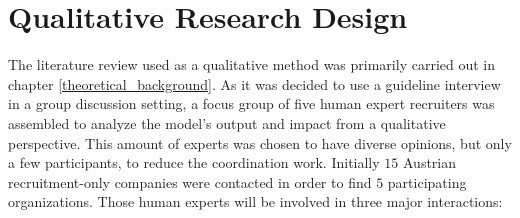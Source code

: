 \documentclass[draft,final]{thesisclass} %
\begin{document}
\section{Qualitative Research Design} \label{qualitative_research_design}
The literature review used as a qualitative method was primarily carried out in chapter \ref{theoretical_background}.
As it was decided to use a guideline interview in a group discussion setting, a focus group of five human expert recruiters was assembled to analyze the model's output and impact from a qualitative perspective.
This amount of experts was chosen to have diverse opinions, but only a few participants, to reduce the coordination work.
Initially $15$ Austrian recruitment-only companies were contacted in order to find $5$ participating organizations.
Those human experts will be involved in three major interactions:
\end{document}
